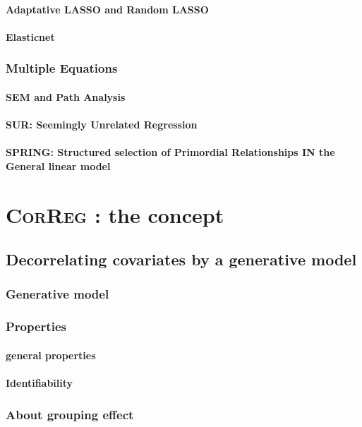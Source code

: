 \documentclass[11pt,a4paper]{report}
\begin{document}
		\subsection{Adaptative LASSO and Random LASSO}
		\subsection{Elasticnet}
	\section{Multiple Equations}
		\subsection{SEM and Path Analysis}
		\subsection{SUR: Seemingly Unrelated Regression}
		\subsection{SPRING: Structured selection of Primordial Relationships IN the General linear model}
\part{\textsc{CorReg} : the concept}
\chapter{Decorrelating covariates by a generative model}
	\section{Generative model}
	\section{Properties}
		\subsection{general properties}
		\subsection{Identifiability}
	\section{About grouping effect}
\end{document}
